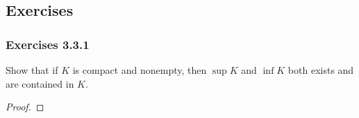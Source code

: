 \subsection{Exercises}

\subsubsection{Exercises 3.3.1} Show that if \( K \) is compact and nonempty, then \( \sup K  \) and \( \inf K \) both exists and are contained in \( K \).
\begin{proof}

\end{proof}


